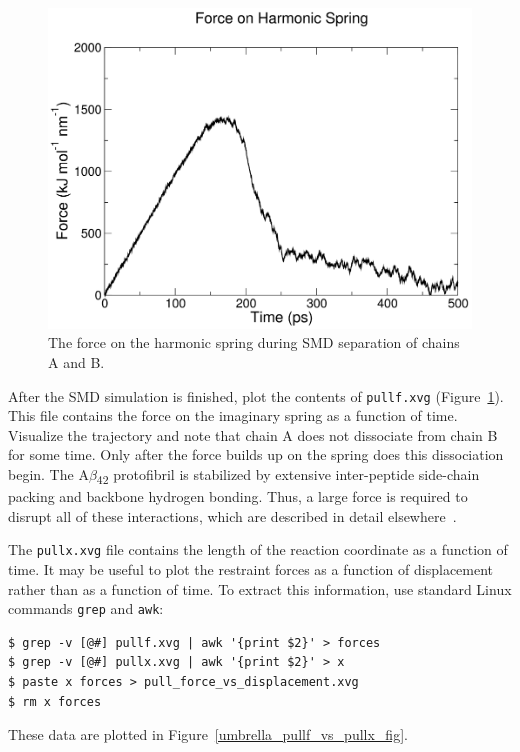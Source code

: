\documentclass[9pt,tutorial,pubversion]{livecoms}
\begin{document}
\begin{figure}[ht!]
\centering
\includegraphics{umbrella_smd_pullf}
\caption{The force on the harmonic spring during SMD separation of chains A and B.}
\label{umbrella_smd_pullf_fig}
\end{figure}

After the SMD simulation is finished, plot the contents of \texttt{pullf.xvg} (Figure~\ref{umbrella_smd_pullf_fig}). This file contains the force on the imaginary spring as a function of time. Visualize the trajectory and note that chain A does not dissociate from chain B for some time. Only after the force builds up on the spring does this dissociation begin. The A$\beta$\textsubscript{42} protofibril is stabilized by extensive inter-peptide side-chain packing and backbone hydrogen bonding. Thus, a large force is required to disrupt all of these interactions, which are described in detail elsewhere~\cite{Lemkul2010}.

The \texttt{pullx.xvg} file contains the length of the reaction coordinate as a function of time. It may be useful to plot the restraint forces as a function of displacement rather than as a function of time. To extract this information, use standard Linux commands \texttt{grep} and \texttt{awk}:

\begin{lstlisting}
$ grep -v [@#] pullf.xvg | awk '{print $2}' > forces
$ grep -v [@#] pullx.xvg | awk '{print $2}' > x
$ paste x forces > pull_force_vs_displacement.xvg
$ rm x forces
\end{lstlisting}

These data are plotted in Figure~\ref{umbrella_pullf_vs_pullx_fig}.
\end{document}
